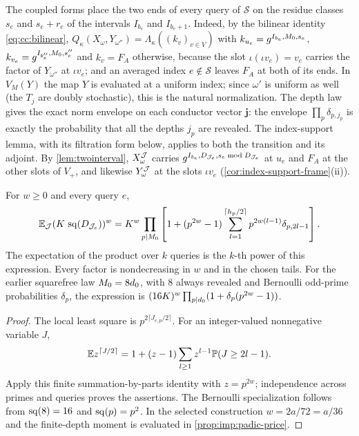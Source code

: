 The coupled forms place the two ends of every query of $\mathcal S$ on the
residue classes $s_e$ and $s_e+r_e$ of the intervals $I_{b_e}$ and
$I_{b_e+1}$. Indeed, by the bilinear identity \eqref{eq:cc:bilinear},
$Q_\kappa(X_\omega,Y_{\omega''})=\Lambda_\kappa((k_v)_{v\in V})$ with
$k_{u_e}=g^{I_{b_e},M_0,s_e}$, $k_{v_e}=g^{I_{b''_e},M_0,s''_e}$ and
$k_v=F_A$ otherwise, because the slot $\iota(\iota v_e)=v_e$ carries the
factor of $Y_{\omega''}$ at $\iota v_e$; and an averaged index $e\notin\mathcal
S$ leaves $F_A$ at both of its ends. In $V_M(Y)$ the map $Y$ is evaluated at
a uniform index; since $\omega'$ is uniform as well (the $T_j$ are doubly
stochastic), this is the natural normalization. The depth law
gives the exact norm envelope on each conductor vector
$\mathbf j$: the envelope $\prod_p\delta_{p,j_p}$ is exactly the
probability that all the depths $j_p$ are revealed.
The index-support lemma, with its filtration form below, applies to
both the transition and its adjoint.
By \cref{lem:twointerval}, $X^{\mathcal J}_\omega$
carries $g^{I_{b_e},D_{\mathcal J_e},s_e\bmod D_{\mathcal J_e}}$ at $u_e$ and $F_A$ at the
other slots of $V_+$, and likewise $Y^{\mathcal J}_\omega$ at the slots $\iota v_e$
(\cref{cor:index-support-frame}(ii)).

\begin{lemma}\label{lem:hyb:moment}
For $w\ge0$ and every query $e$,
\[
 \mathbb E_{\mathcal J}(K\,\operatorname{sq}(D_{\mathcal J_e}))^w
 =K^w\prod_{p\mid M_0}
 \left[1+(p^{2w}-1)\sum_{l=1}^{\lceil h_p/2\rceil}
 p^{2w(l-1)}\delta_{p,2l-1}\right].
\]
The expectation of the product over $k$ queries is the $k$-th power
of this expression. Every factor is nondecreasing in $w$ and in the
chosen tails. For the earlier squarefree law $M_0=8d_0$, with
$8$ always revealed and Bernoulli odd-prime probabilities $\delta_p$,
the expression is $(16K)^w\prod_{p\mid d_0}(1+\delta_p(p^{2w}-1))$.
\end{lemma}
\begin{proof}
The local least square is $p^{2\lceil J_{e,p}/2\rceil}$.
For an integer-valued nonnegative variable $J$,
\[
 \mathbb E z^{\lceil J/2\rceil}
 =1+(z-1)\sum_{l\ge1}z^{l-1}\mathbb P(J\ge2l-1).
\]
Apply this finite summation-by-parts identity with $z=p^{2w}$;
independence across primes and queries proves the assertions.
The Bernoulli specialization follows from $\operatorname{sq}(8)=16$ and
$\operatorname{sq}(p)=p^2$. In the selected construction $w=2a/72=a/36$
and the finite-depth moment is evaluated in \cref{prop:imp:padic-price}.
\end{proof}


